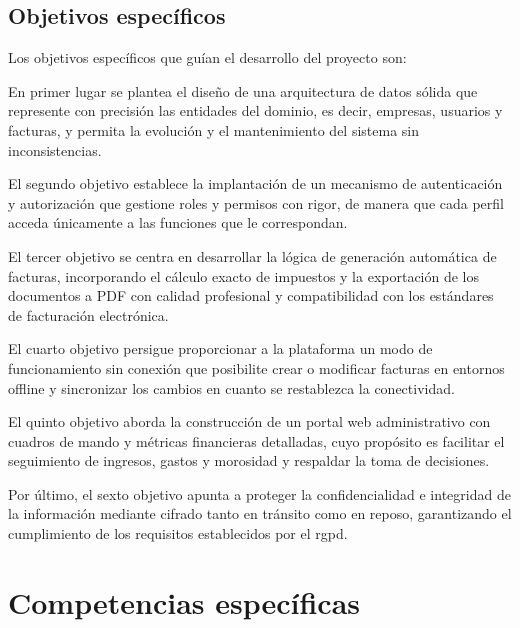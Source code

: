 \subsection{Objetivos específicos}

\begin{large}

Los objetivos específicos que guían el desarrollo del proyecto son:

En primer lugar se plantea el diseño de una arquitectura de datos sólida que represente con precisión las entidades del dominio, es decir, empresas, usuarios y facturas, y permita la evolución y el mantenimiento del sistema sin inconsistencias.

El segundo objetivo establece la implantación de un mecanismo de autenticación y autorización que gestione roles y permisos con rigor, de manera que cada perfil acceda únicamente a las funciones que le correspondan.

El tercer objetivo se centra en desarrollar la lógica de generación automática de facturas, incorporando el cálculo exacto de impuestos y la exportación de los documentos a PDF con calidad profesional y compatibilidad con los estándares de facturación electrónica.

El cuarto objetivo persigue proporcionar a la plataforma un modo de funcionamiento sin conexión que posibilite crear o modificar facturas en entornos offline y sincronizar los cambios en cuanto se restablezca la conectividad.

El quinto objetivo aborda la construcción de un portal web administrativo con cuadros de mando y métricas financieras detalladas, cuyo propósito es facilitar el seguimiento de ingresos, gastos y morosidad y respaldar la toma de decisiones.

Por último, el sexto objetivo apunta a proteger la confidencialidad e integridad de la información mediante cifrado tanto en tránsito como en reposo, garantizando el cumplimiento de los requisitos establecidos por el \gls{rgpd}.

\end{large}

\section{Competencias específicas}

